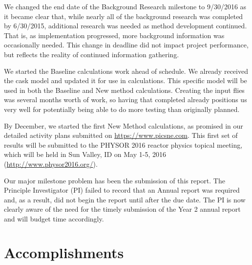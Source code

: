 \documentclass[12pt]{article}
\begin{document}
We changed the end date of the Background Research milestone to 9/30/2016 as it became clear that, while nearly all of the background research was completed by 6/30/2015, additional research was needed as method development continued.
That is, as implementation progressed, more background information was occasionally needed. 
This change in deadline did not impact project performance, but reflects the reality of continued information gathering.

We started the Baseline calculations work ahead of schedule. 
We already received the cask model and updated it for use in calculations. 
This specific model will be used in both the Baseline and New method calculations.  Creating the input flies was several months worth of work, so having that completed already positions us very well for potentially being able to do more testing than originally planned. 

By December, we started the first New Method calculations, as promised in our detailed activity plans submitted on \href{https://www.picsne.com}{https://www.picsne.com}. 
This first set of results will be submitted to the PHYSOR 2016 reactor physics topical meeting, which will be held in Sun Valley, ID on May 1-5, 2016 \\(\href{http://www.physor2016.org/}{http://www.physor2016.org/}). 

Our major milestone problem has been the submission of this report. 
The Principle Investigator (PI) failed to record that an Annual report was required and, as a result, did not begin the report until after the due date. 
The PI is now clearly aware of the need for the timely submission of the Year 2 annual report and will budget time accordingly.


\section{Accomplishments}
\label{sect::accomplishments}
\end{document}
